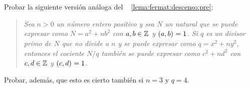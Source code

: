 \begin{ejerFermat}\label{ejer:fermat:descenso:pre}
	Probar la siguiente versi\'on an\'aloga del \lemaname~%
	\ref{lema:fermat:descenso:pre}:
	\begin{quote}
		\itshape
		Sea $n>0$ un n\'umero entero positivo y sea $N$ un natural
		que se puede expresar como $N=a^2+nb^2$ con $a,b\in\mathbb{Z}$
		y $\left({a,b}\right)_{}=1$. Si $q$ es un divisor primo de $N$ que no
		divide a $n$ y se puede expresar como $q=x^2+ny^2$,
		entonces el cociente $N/q$ tambi\'en se puede expresar como
		$c^2+nd^2$ con $c,d\in\mathbb{Z}$ y $\left({c,d}\right)_{}=1$.
	\end{quote}
	Probar, adem\'as, que esto es cierto tambi\'en si $n=3$ y $q=4$.%
\end{ejerFermat}

